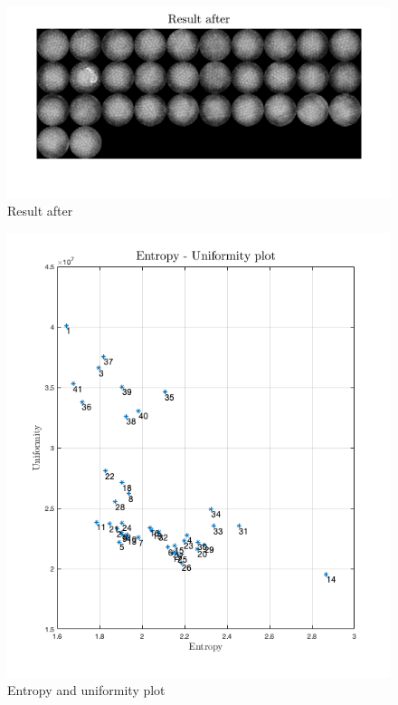 \documentclass[oneside,a4paper]{article}
\begin{document}
\begin{figure}[ht!]
\centering
\includegraphics[width=140mm]{figures/q7after.png}
\caption{Result after}
\label{fig:Q7after}
\end{figure}

\newpage

\begin{figure}[ht!]
\centering
\includegraphics[width=140mm]{figures/uniformity_entropy.png}
\caption{Entropy and uniformity plot}
\label{fig:entro}
\end{figure}
\end{document}
